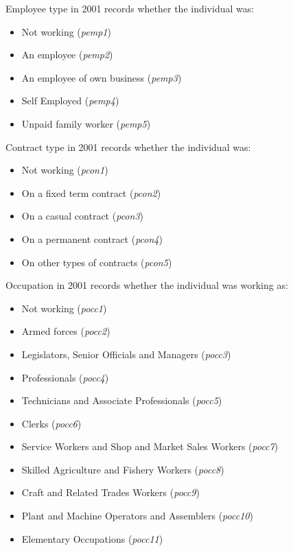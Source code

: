 \documentclass[12pt, a4paper]{article}
\begin{document}
Employee type in 2001 records whether the individual was:
\begin{itemize}
  \item Not working (\textit{p\textunderscore{}emp1})
  \item An employee (\textit{p\textunderscore{}emp2})
  \item An employee of own business (\textit{p\textunderscore{}emp3})
  \item Self Employed (\textit{p\textunderscore{}emp4})
  \item Unpaid family worker (\textit{p\textunderscore{}emp5})
\end{itemize}  
  
Contract type in 2001 records whether the individual was:
\begin{itemize}
  \item Not working (\textit{p\textunderscore{}con1})
  \item On a fixed term contract (\textit{p\textunderscore{}con2})
  \item On a casual contract (\textit{p\textunderscore{}con3})
  \item On a permanent contract (\textit{p\textunderscore{}con4})
  \item On other types of contracts (\textit{p\textunderscore{}con5})
\end{itemize}  
  
Occupation in 2001 records whether the individual was working as:
\begin{itemize}
  \item Not working (\textit{p\textunderscore{}occ1})
  \item Armed forces (\textit{p\textunderscore{}occ2})
  \item Legislators, Senior Officials and Managers (\textit{p\textunderscore{}occ3})
  \item Professionals (\textit{p\textunderscore{}occ4})
  \item Technicians and Associate Professionals (\textit{p\textunderscore{}occ5})
  \item Clerks (\textit{p\textunderscore{}occ6})
  \item Service Workers and Shop and Market Sales Workers (\textit{p\textunderscore{}occ7})
  \item Skilled Agriculture and Fishery Workers (\textit{p\textunderscore{}occ8})
  \item Craft and Related Trades Workers (\textit{p\textunderscore{}occ9})
  \item Plant and Machine Operators and Assemblers (\textit{p\textunderscore{}occ10})
  \item Elementary Occupations (\textit{p\textunderscore{}occ11})
\end{itemize}  
  
\end{document}
